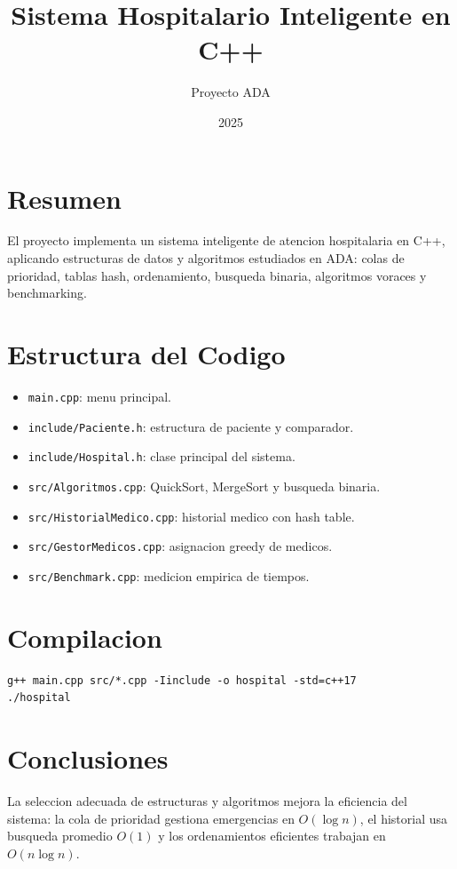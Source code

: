 \documentclass[a4paper,12pt]{article}
\begin{document}
\title{Sistema Hospitalario Inteligente en C++}
\author{Proyecto ADA}
\date{2025}
\maketitle

\tableofcontents
\newpage

\section{Resumen}

El proyecto implementa un sistema inteligente de atencion hospitalaria en C++,
aplicando estructuras de datos y algoritmos estudiados en ADA: colas de prioridad,
tablas hash, ordenamiento, busqueda binaria, algoritmos voraces y benchmarking.

\section{Estructura del Codigo}

\begin{itemize}
  \item \texttt{main.cpp}: menu principal.
  \item \texttt{include/Paciente.h}: estructura de paciente y comparador.
  \item \texttt{include/Hospital.h}: clase principal del sistema.
  \item \texttt{src/Algoritmos.cpp}: QuickSort, MergeSort y busqueda binaria.
  \item \texttt{src/HistorialMedico.cpp}: historial medico con hash table.
  \item \texttt{src/GestorMedicos.cpp}: asignacion greedy de medicos.
  \item \texttt{src/Benchmark.cpp}: medicion empirica de tiempos.
\end{itemize}

\section{Compilacion}

\begin{lstlisting}
g++ main.cpp src/*.cpp -Iinclude -o hospital -std=c++17
./hospital
\end{lstlisting}

\section{Conclusiones}

La seleccion adecuada de estructuras y algoritmos mejora la eficiencia del sistema:
la cola de prioridad gestiona emergencias en $O(\log n)$, el historial usa busqueda
promedio $O(1)$ y los ordenamientos eficientes trabajan en $O(n \log n)$.
\end{document}
